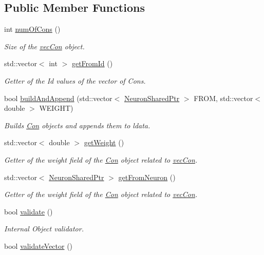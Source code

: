 \subsection*{Public Member Functions}
\begin{DoxyCompactItemize}
\item 
int \hyperlink{classvec_con_a1e39a5e78c40ae8af9bbd2fd7f0dc749}{numOfCons} ()
\begin{DoxyCompactList}\small\item\em Size of the \hyperlink{classvec_con}{vecCon} object. \end{DoxyCompactList}\item 
std::vector$<$ int $>$ \hyperlink{classvec_con_aa9f3f5df4c4060951c975c4c829b8471}{getFromId} ()
\begin{DoxyCompactList}\small\item\em Getter of the Id values of the vector of Cons. \end{DoxyCompactList}\item 
bool \hyperlink{classvec_con_ae53dc9d379d1544cb441d316c5d15ecd}{buildAndAppend} (std::vector$<$ \hyperlink{_a_m_o_r_e_8h_a03051950b0faf9499d14cf376e04c329}{NeuronSharedPtr} $>$ FROM, std::vector$<$ double $>$ WEIGHT)
\begin{DoxyCompactList}\small\item\em Builds \hyperlink{class_con}{Con} objects and appends them to ldata. \end{DoxyCompactList}\item 
std::vector$<$ double $>$ \hyperlink{classvec_con_a76f10669494f2247d036ae6a1f296873}{getWeight} ()
\begin{DoxyCompactList}\small\item\em Getter of the weight field of the \hyperlink{class_con}{Con} object related to \hyperlink{classvec_con}{vecCon}. \end{DoxyCompactList}\item 
std::vector$<$ \hyperlink{_a_m_o_r_e_8h_a03051950b0faf9499d14cf376e04c329}{NeuronSharedPtr} $>$ \hyperlink{classvec_con_ae72d00aedcd054e690f1dcf2ca5ac2c2}{getFromNeuron} ()
\begin{DoxyCompactList}\small\item\em Getter of the weight field of the \hyperlink{class_con}{Con} object related to \hyperlink{classvec_con}{vecCon}. \end{DoxyCompactList}\item 
bool \hyperlink{classvec_con_a7dc281e7258bf8be19a1591501c5434d}{validate} ()
\begin{DoxyCompactList}\small\item\em Internal Object validator. \end{DoxyCompactList}\item 
bool \hyperlink{classvec_con_a948d5488bc5871d0d289e692affa5818}{validateVector} ()
\end{DoxyCompactItemize}


